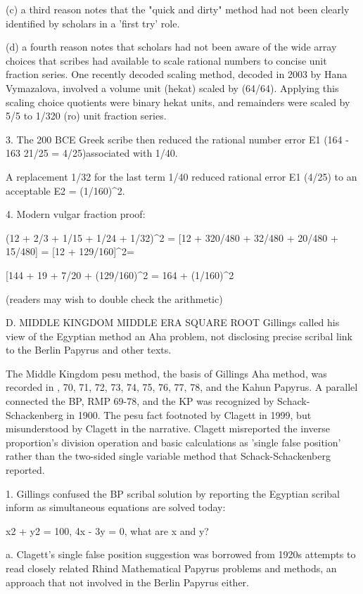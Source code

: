\documentclass[12pt]{article}
\begin{document}
{(c) a third reason notes that the "quick and dirty" method had not been clearly identified by scholars in a 'first try' role. 

(d) a fourth reason notes that scholars had not been aware of the wide array choices that scribes had available to scale rational numbers to concise unit fraction series. One recently decoded scaling method, decoded in 2003 by Hana Vymazalova, involved a volume unit (hekat) scaled by (64/64). Applying this scaling choice quotients were binary hekat units, and remainders were scaled by 5/5 to 1/320 (ro) unit fraction series. 

3. The 200 BCE Greek scribe then reduced the rational number error E1 (164 - 163 21/25 = 4/25)associated with 1/40. 

A replacement 1/32  for the last term 1/40 reduced rational error E1 (4/25) to an acceptable E2 = (1/160)^2.

4. Modern vulgar fraction proof: 

(12 + 2/3 + 1/15 + 1/24 + 1/32)^2 = [12 + 320/480 + 32/480 + 20/480 + 15/480] = [12 + 129/160]^2=

 [144 + 19 + 7/20 + (129/160)^2 = 164 + (1/160)^2 

(readers may wish to double check the arithmetic)

D. MIDDLE KINGDOM MIDDLE ERA SQUARE ROOT 
Gillings called his view of the Egyptian method an Aha problem, not disclosing precise scribal link to the Berlin Papyrus and other texts. 
 
The Middle Kingdom pesu method, the basis of Gillings Aha method, was recorded in , 70, 71, 72, 73, 74, 75, 76, 77, 78,  and the Kahun Papyrus. A parallel connected the BP, RMP 69-78, and the KP was recognized by Schack-Schackenberg in 1900. The pesu fact footnoted by Clagett in 1999, but misunderstood by Clagett in the narrative. Clagett misreported the inverse proportion's division operation and basic calculations as 'single false position' rather than the two-sided single variable method that Schack-Schackenberg reported. 

1. Gillings confused the BP scribal solution by reporting the Egyptian scribal inform as simultaneous equations are solved today:

   x2 + y2 = 100,   4x - 3y = 0,  what are x and y?

a. Clagett's single false position suggestion was borrowed from 1920s attempts to read closely related Rhind Mathematical Papyrus problems and methods, an approach that not involved in the Berlin Papyrus either. 

}
\end{document}
